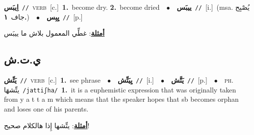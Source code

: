 \documentclass[10pt,a4paper,twoside]{article} %
\begin{document}
\begin{multicols}{2}
{{\setlength\topsep{0pt}\textbf{\foreignlanguage{arabic}{اِيبَس}}\ {\color{gray}\texttt{//}\color{black}}\ \textsc{verb}\ [c.]\ \textbf{1.}~become dry.  \textbf{2.}~become dried\ \ $\bullet$\ \ \setlength\topsep{0pt}\textbf{\foreignlanguage{arabic}{ييبَس}}\ {\color{gray}\texttt{//}\color{black}}\ [i.]\ \color{gray}(msa. \foreignlanguage{arabic}{يُصْبِح جاف}~\foreignlanguage{arabic}{\textbf{١.}})\color{black}\ \ $\bullet$\ \ \setlength\topsep{0pt}\textbf{\foreignlanguage{arabic}{يِبِس}}\ {\color{gray}\texttt{//}\color{black}}\ [p.]\  \begin{flushright}\color{gray}\foreignlanguage{arabic}{\textbf{\underline{\foreignlanguage{arabic}{أمثلة}}}: غطِّي المعمول بلاش ما ييبَس}\end{flushright}\color{black}} \vspace{2mm}

\vspace{-3mm}
\subsection*{\color{blue}\foreignlanguage{arabic}{ي.ت.ش}\color{blue}{}} 

{\setlength\topsep{0pt}\textbf{\foreignlanguage{arabic}{يَتِّش}}\ {\color{gray}\texttt{//}\color{black}}\ \textsc{verb}\ [c.]\ \textbf{1.}~see phrase\ \ $\bullet$\ \ \setlength\topsep{0pt}\textbf{\foreignlanguage{arabic}{يِيَتِّش}}\ {\color{gray}\texttt{//}\color{black}}\ [i.]\ \ $\bullet$\ \ \setlength\topsep{0pt}\textbf{\foreignlanguage{arabic}{يَتَّش}}\ {\color{gray}\texttt{//}\color{black}}\ [p.]\ \ $\bullet$\ \ \textsc{ph.} \color{gray} \foreignlanguage{arabic}{يتِّشهَا}\color{black}\ {\color{gray}\texttt{/{\sffamily jattiʃha}/}\color{black}}\ \textbf{1.}~it is a euphemistic expression that was originally taken from y a t t a m which means that the speaker hopes that sb becomes orphan and loses one of his parents.\  \begin{flushright}\color{gray}\foreignlanguage{arabic}{\textbf{\underline{\foreignlanguage{arabic}{أمثلة}}}: يتِّشها إِذا هالكلام صحيح!}\end{flushright}\color{black}} \vspace{2mm}

}
\end{multicols}
\end{document}
